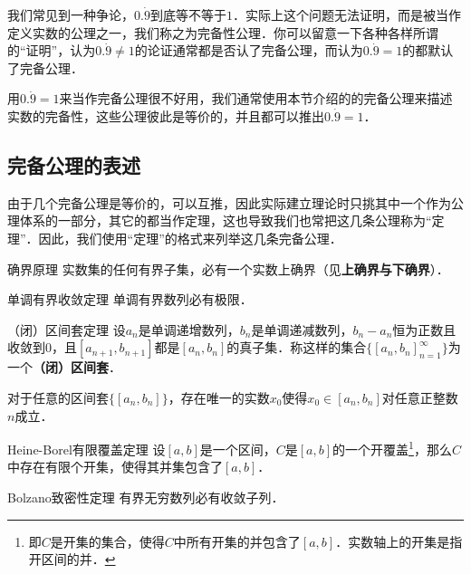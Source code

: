 



我们常见到一种争论，$0.\dot{9}$到底等不等于$1$．实际上这个问题无法证明，而是被当作定义实数的公理之一，我们称之为完备性公理．你可以留意一下各种各样所谓的“证明”，认为$0.\dot{9}\neq 1$的论证通常都是否认了完备公理，而认为$0.\dot{9}=1$的都默认了完备公理．

用$0.\dot{9}=1$来当作完备公理很不好用，我们通常使用本节介绍的的完备公理来描述实数的完备性，这些公理彼此是等价的，并且都可以推出$0.\dot{9}=1$．

\subsection{完备公理的表述}

由于几个完备公理是等价的，可以互推，因此实际建立理论时只挑其中一个作为公理体系的一部分，其它的都当作定理，这也导致我们也常把这几条公理称为“定理”．因此，我们使用“定理”的格式来列举这几条完备公理．

\begin{theorem}{确界原理}\label{RCompl_the1}
实数集的任何有界子集，必有一个实数上确界（见\textbf{上确界与下确界}）．
\end{theorem}

\begin{theorem}{单调有界收敛定理}\label{RCompl_the2}
单调有界数列必有极限．
\end{theorem}

\begin{theorem}{（闭）区间套定理}\label{RCompl_the3}
设$a_n$是单调递增数列，$b_n$是单调递减数列，$b_n-a_n$恒为正数且收敛到$0$，且$[a_{n+1}, b_{n+1}]$都是$[a_n, b_n]$的真子集．称这样的集合$\{[a_n, b_n]_{n=1}^\infty\}$为一个\textbf{（闭）区间套}．

对于任意的区间套$\{[a_n, b_n]\}$，存在唯一的实数$x_0$使得$x_0\in [a_n, b_n]$对任意正整数$n$成立．
\end{theorem}

\begin{theorem}{Heine-Borel有限覆盖定理}\label{RCompl_the4}
设$[a, b]$是一个区间，$C$是$[a, b]$的一个开覆盖\footnote{即$C$是开集的集合，使得$C$中所有开集的并包含了$[a, b]$．实数轴上的开集是指开区间的并．}，那么$C$中存在有限个开集，使得其并集包含了$[a, b]$．
\end{theorem}

\begin{theorem}{Bolzano致密性定理}\label{RCompl_the5}
有界无穷数列必有收敛子列．
\end{theorem}

